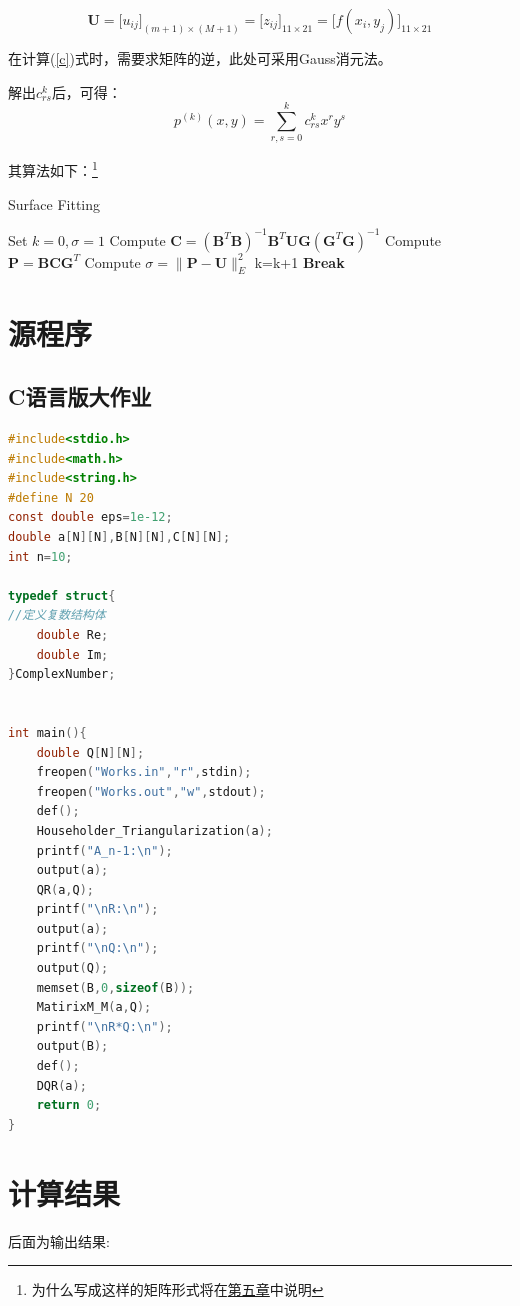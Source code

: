 \[\bm{U} =
\big[u_{ij}\big]_{(m+1)\times (M+1)}=
\big[z_{ij}\big]_{11\times 21}=
\big[f(x_i,y_j)\big]_{11\times 21}
\]

在计算(\ref{c})式时，需要求矩阵的逆，此处可采用Gauss消元法。

解出$c_{rs}^{k}$后，可得：
\[p^{(k)}(x,y) = \sum\limits_{r,s = 0}^k {{c_{rs}^{k}}{x^r}{y^s}} \]



其算法如下：\footnote{为什么写成这样的矩阵形式将在\hyperref[sec:discuss]{第五章}中说明}

\begin{algorithm}[h]  
\caption{Surface Fitting }  
\begin{algorithmic}[1]  
\STATE Set $k=0,\sigma=1$
\WHILE {$\sigma >\varepsilon$}
\STATE Compute $\bm{C}=(\bm{B}^T\bm{B})^{-1}\bm{B}^T\bm{U}\bm{G}(\bm{G}^T\bm{G})^{-1}$ 
\STATE Compute $\bm{P}=\bm{B}\bm{C}\bm{G}^T$ 
\STATE Compute $\sigma={\|{\bm{P}-\bm{U}}\|_{E}^2}$
\STATE k=k+1
\STATE \textbf{Break}
\ENDIF 
\ENDWHILE
\end{algorithmic}  
\end{algorithm}  

\newpage



\chapter{源程序}
\section{C语言版大作业}
\begin{lstlisting}[language=C]
#include<stdio.h>
#include<math.h>
#include<string.h>
#define N 20
const double eps=1e-12;
double a[N][N],B[N][N],C[N][N];
int n=10;

typedef struct{
//定义复数结构体
    double Re;
    double Im;
}ComplexNumber;


int main(){
	double Q[N][N];
	freopen("Works.in","r",stdin);
	freopen("Works.out","w",stdout);
	def();
	Householder_Triangularization(a);
	printf("A_n-1:\n");
	output(a);
	QR(a,Q);
	printf("\nR:\n");
	output(a);
	printf("\nQ:\n");
	output(Q);
	memset(B,0,sizeof(B));
	MatirixM_M(a,Q);
	printf("\nR*Q:\n");
	output(B);
	def();
	DQR(a);
	return 0;
}
\end{lstlisting}




\chapter{计算结果}
后面为输出结果:
\newpage


